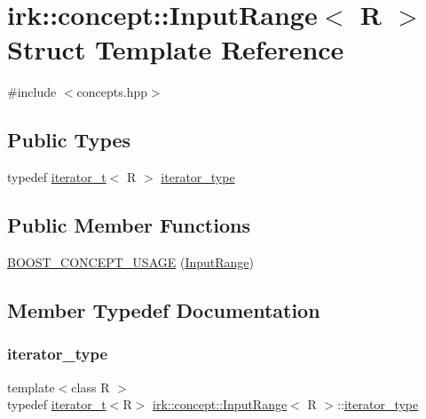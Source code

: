 \hypertarget{structirk_1_1concept_1_1InputRange}{}\section{irk\+:\+:concept\+:\+:Input\+Range$<$ R $>$ Struct Template Reference}
\label{structirk_1_1concept_1_1InputRange}


{\ttfamily \#include $<$concepts.\+hpp$>$}

\subsection*{Public Types}
\begin{DoxyCompactItemize}
\item 
typedef \mbox{\hyperlink{namespaceirk_a333e3104afd57c79fb0c18b90081520a}{iterator\+\_\+t}}$<$ R $>$ \mbox{\hyperlink{structirk_1_1concept_1_1InputRange_ae371697a8302b5517a872683f0cd457a}{iterator\+\_\+type}}
\end{DoxyCompactItemize}
\subsection*{Public Member Functions}
\begin{DoxyCompactItemize}
\item 
\mbox{\hyperlink{structirk_1_1concept_1_1InputRange_a6330299c4f829cf1bcc9bc1103a660ac}{B\+O\+O\+S\+T\+\_\+\+C\+O\+N\+C\+E\+P\+T\+\_\+\+U\+S\+A\+GE}} (\mbox{\hyperlink{structirk_1_1concept_1_1InputRange}{Input\+Range}})
\end{DoxyCompactItemize}


\subsection{Member Typedef Documentation}
\mbox{\label{structirk_1_1concept_1_1InputRange_ae371697a8302b5517a872683f0cd457a}} 
\subsubsection{\texorpdfstring{iterator\+\_\+type}{iterator\_type}}
{\footnotesize\ttfamily template$<$class R $>$ \\
typedef \mbox{\hyperlink{namespaceirk_a333e3104afd57c79fb0c18b90081520a}{iterator\+\_\+t}}$<$R$>$ \mbox{\hyperlink{structirk_1_1concept_1_1InputRange}{irk\+::concept\+::\+Input\+Range}}$<$ R $>$\+::\mbox{\hyperlink{structirk_1_1concept_1_1InputRange_ae371697a8302b5517a872683f0cd457a}{iterator\+\_\+type}}}



